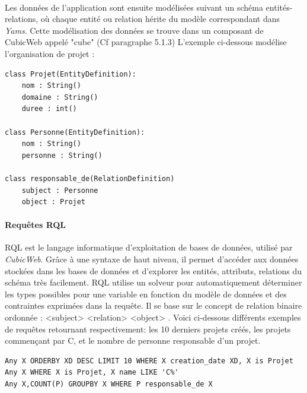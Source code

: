 \documentclass {report}
\begin{document}
\paragraph{}
Les données de l'application sont ensuite modélisées suivant un schéma entités-relations, où chaque entité ou relation hérite du modèle correspondant dans \textit{Yams}. Cette modélisation des données se trouve dans un composant de CubicWeb appelé "cube" (Cf paragraphe 5.1.3) L'exemple ci-dessous modélise l'organisation de projet :

\renewcommand{\lstlistingname}{Exemple}
\begin{lstlisting}[caption= Schéma de l'organisation d'un projet]
class Projet(EntityDefinition):
	nom : String()
	domaine : String()
	duree : int()

class Personne(EntityDefinition):
	nom : String()
	personne : String()
	
class responsable_de(RelationDefinition)
	subject : Personne
	object : Projet
\end{lstlisting}

\paragraph{Requêtes RQL}
RQL est le langage informatique d'exploitation de bases de données, utilisé par \textit{CubicWeb}. Grâce à une syntaxe de haut niveau, il permet d'accéder aux données stockées dans les bases de données et d'explorer les entités, attributs, relations du schéma très facilement. RQL utilise un solveur pour automatiquement déterminer les types possibles pour une variable en fonction du modèle de données et des contraintes exprimées dans la requête. Il se base sur le concept de relation binaire ordonnée : <subject> <relation> <object> . Voici ci-dessous différents exemples de requêtes retournant respectivement: les 10 derniers projets créés, les projets commençant par C, et le nombre de personne responsable d'un projet.

\renewcommand{\lstlistingname}{Exemple}
\begin{lstlisting}[caption= Requêtes RQL]
Any X ORDERBY XD DESC LIMIT 10 WHERE X creation_date XD, X is Projet
Any X WHERE X is Projet, X name LIKE 'C%'
Any X,COUNT(P) GROUPBY X WHERE P responsable_de X
\end{lstlisting}
\end{document}
